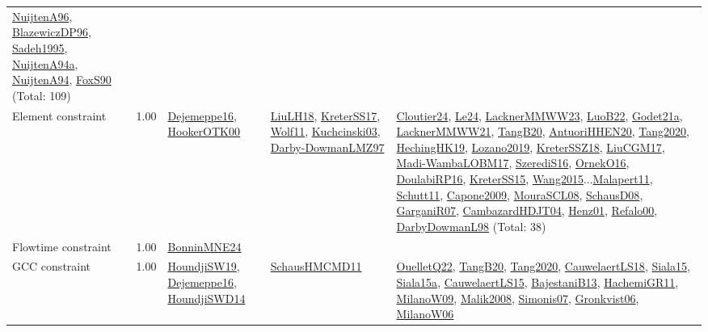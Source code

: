 {\begin{longtable}{p{3cm}r>{\raggedright\arraybackslash}p{6cm}>{\raggedright\arraybackslash}p{6cm}>{\raggedright\arraybackslash}p{8cm}}
\hyperref[detail:NuijtenA96]{NuijtenA96}, \hyperref[detail:BlazewiczDP96]{BlazewiczDP96}, \hyperref[detail:Sadeh1995]{Sadeh1995}, \hyperref[detail:NuijtenA94a]{NuijtenA94a}, \hyperref[detail:NuijtenA94]{NuijtenA94}, \hyperref[detail:FoxS90]{FoxS90} (Total: 109)\\
\index{Element constraint}\index{Constraints!Element constraint}Element constraint &  1.00 & \hyperref[detail:Dejemeppe16]{Dejemeppe16}, \hyperref[detail:HookerOTK00]{HookerOTK00} & \hyperref[detail:LiuLH18]{LiuLH18}, \hyperref[detail:KreterSS17]{KreterSS17}, \hyperref[detail:Wolf11]{Wolf11}, \hyperref[detail:Kuchcinski03]{Kuchcinski03}, \hyperref[detail:Darby-DowmanLMZ97]{Darby-DowmanLMZ97} & \hyperref[detail:Cloutier24]{Cloutier24}, \hyperref[detail:Le24]{Le24}, \hyperref[detail:LacknerMMWW23]{LacknerMMWW23}, \hyperref[detail:LuoB22]{LuoB22}, \hyperref[detail:Godet21a]{Godet21a}, \hyperref[detail:LacknerMMWW21]{LacknerMMWW21}, \hyperref[detail:TangB20]{TangB20}, \hyperref[detail:AntuoriHHEN20]{AntuoriHHEN20}, \hyperref[detail:Tang2020]{Tang2020}, \hyperref[detail:HechingHK19]{HechingHK19}, \hyperref[detail:Lozano2019]{Lozano2019}, \hyperref[detail:KreterSSZ18]{KreterSSZ18}, \hyperref[detail:LiuCGM17]{LiuCGM17}, \hyperref[detail:Madi-WambaLOBM17]{Madi-WambaLOBM17}, \hyperref[detail:SzerediS16]{SzerediS16}, \hyperref[detail:OrnekO16]{OrnekO16}, \hyperref[detail:DoulabiRP16]{DoulabiRP16}, \hyperref[detail:KreterSS15]{KreterSS15}, \hyperref[detail:Wang2015]{Wang2015}...\hyperref[detail:Malapert11]{Malapert11}, \hyperref[detail:Schutt11]{Schutt11}, \hyperref[detail:Capone2009]{Capone2009}, \hyperref[detail:MouraSCL08]{MouraSCL08}, \hyperref[detail:SchausD08]{SchausD08}, \hyperref[detail:GarganiR07]{GarganiR07}, \hyperref[detail:CambazardHDJT04]{CambazardHDJT04}, \hyperref[detail:Henz01]{Henz01}, \hyperref[detail:Refalo00]{Refalo00}, \hyperref[detail:DarbyDowmanL98]{DarbyDowmanL98} (Total: 38)\\
\index{Flowtime constraint}\index{Constraints!Flowtime constraint}Flowtime constraint &  1.00 & \hyperref[detail:BonninMNE24]{BonninMNE24} &  & \\
\index{GCC constraint}\index{Constraints!GCC constraint}GCC constraint &  1.00 & \hyperref[detail:HoundjiSW19]{HoundjiSW19}, \hyperref[detail:Dejemeppe16]{Dejemeppe16}, \hyperref[detail:HoundjiSWD14]{HoundjiSWD14} & \hyperref[detail:SchausHMCMD11]{SchausHMCMD11} & \hyperref[detail:OuelletQ22]{OuelletQ22}, \hyperref[detail:TangB20]{TangB20}, \hyperref[detail:Tang2020]{Tang2020}, \hyperref[detail:CauwelaertLS18]{CauwelaertLS18}, \hyperref[detail:Siala15]{Siala15}, \hyperref[detail:Siala15a]{Siala15a}, \hyperref[detail:CauwelaertLS15]{CauwelaertLS15}, \hyperref[detail:BajestaniB13]{BajestaniB13}, \hyperref[detail:HachemiGR11]{HachemiGR11}, \hyperref[detail:MilanoW09]{MilanoW09}, \hyperref[detail:Malik2008]{Malik2008}, \hyperref[detail:Simonis07]{Simonis07}, \hyperref[detail:Gronkvist06]{Gronkvist06}, \hyperref[detail:MilanoW06]{MilanoW06}\\

\end{longtable}}
